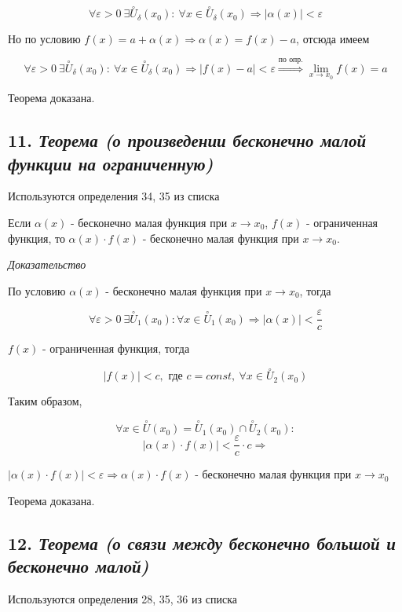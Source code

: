$$
\forall{\varepsilon} > 0 \ \exists \overset{\circ}U_\delta(x_0): \ \forall x \in \overset{\circ}U_\delta(x_0) \Rightarrow |\alpha(x)| <{\varepsilon}
$$

Но по условию $f(x) = a + \alpha(x) \Rightarrow \alpha(x) = f(x) - a$, отсюда имеем

$$
\forall{\varepsilon} > 0 \ \exists \overset{\circ}U_\delta(x_0): \ \forall x \in \overset{\circ}U_\delta(x_0) \Rightarrow |f(x) - a| <{\varepsilon} \overset{\text{по опр.}}\Rightarrow \lim\limits_{x \to x_0}f(x) = a
$$

Теорема доказана.
\newpage 
\subsection*{11. \textit{Теорема (о произведении бесконечно малой функции на ограниченную)}}
\begin{Quote2} 
\small\centering 

Используются определения 34, 35 из списка \end{Quote2} 

Если $\alpha(x)$ - бесконечно малая функция при $x \rightarrow x_0$, $f(x)$ - ограниченная функция, то $\alpha(x)\cdot f(x)$ - бесконечно малая функция при $x \rightarrow x_0$.
\vspace*{20pt} 

\textit{Доказательство}

По условию $\alpha(x)$ - бесконечно малая функция при $x \rightarrow x_0$, тогда

$$
\forall {\varepsilon} > 0 \ \exists\overset{\circ}U_1(x_0): 
\forall x \in \overset{\circ}U_1(x_0) \Rightarrow |\alpha(x)| < \dfrac{ {\varepsilon}}{c}
$$

$f(x)$ - ограниченная функция, тогда

$$
|f(x)| < c, \text{ где } c = const, \ \forall x \in \overset{\circ}U_2(x_0)
$$

Таким образом,

$$
\forall x \in \overset{\circ}U(x_0) = \overset{\circ}U_1(x_0) \cap \overset{\circ}U_2(x_0):
$$ $$
|\alpha(x)\cdot f(x)| < \dfrac{ {\varepsilon}}{c} \cdot c \Rightarrow
$$

$ \mid \alpha(x)\cdot f(x)\mid  < {\varepsilon} \Rightarrow \alpha(x)\cdot f(x)$ - бесконечно малая функция при $x \rightarrow x_0$

Теорема доказана.
\newpage 
\subsection*{12. \textit{Теорема (о связи между бесконечно большой и бесконечно малой)}}
\begin{Quote2} 
\small\centering 

Используются определения 28, 35, 36 из списка \end{Quote2} 

